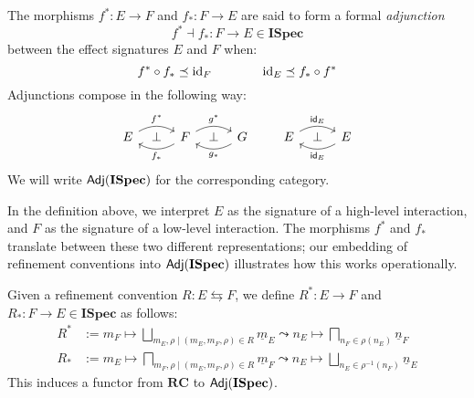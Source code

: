 \documentclass[sigplan,10pt,authordraft]{acmart}
\newcommand{\ISpec}{\mathbf{ISpec}}
\begin{document}
\begin{definition}[Adjunction]
The morphisms
$f^* : E \rightarrow F$ and $f_* : F \rightarrow E$
are said to form a formal \emph{adjunction}
\[ f^* \dashv f_* : F \rightarrow E \in \ISpec \]
between the effect signatures $E$ and $F$
when:
\[
  f^* \circ f_* \preceq \mathrm{id}_F
  \qquad \qquad
  \mathrm{id}_E \preceq f_* \circ f^*
\]
Adjunctions compose in the following way:
\[
  \begin{tikzcd}[sep=tiny]
    E \ar[rr, "f^*", bend left] & \bot &
    F \ar[ll, "f_*", bend left]
      \ar[rr, "g^*", bend left] & \bot &
    G \ar[ll, "g_*", bend left]
  \end{tikzcd}
  \qquad
  \begin{tikzcd}[sep=tiny]
    E \ar[rr, "\kw{id}_E", bend left] & \bot &
    E \ar[ll, "\kw{id}_E", bend left]
  \end{tikzcd}
\]
We will write $\kw{Adj}(\ISpec)$ for the corresponding category.
\end{definition}

In the definition above,
we interpret
$E$ as the signature of a high-level interaction, and
$F$ as the signature of a low-level interaction.
The morphisms $f^*$ and $f_*$ translate between
these two different representations;
our embedding of refinement conventions into $\kw{Adj}(\ISpec)$
illustrates how this works operationally.

\begin{definition}
Given a refinement convention $R : E \leftrightarrows F$,
we define
$R^* : E \rightarrow F$ and
$R_* : F \rightarrow E \in \ISpec$ as follows:
\begin{align*}
  R^* &:= m_F \mapsto
    \bigsqcup_{m_E, \rho \mid (m_E, m_F, \rho) \in R}
    \underline{m}_E \leadsto n_E \mapsto
    \bigsqcap_{n_F \in \rho(n_E)}
    \underline{n}_F
  \\
  R_* &:= m_E \mapsto
    \bigsqcap_{m_F, \rho \mid (m_E, m_F, \rho) \in R}
    \underline{m}_F \leadsto n_E \mapsto
    \bigsqcup_{n_E \in \rho^{-1}(n_F)}
    \underline{n}_E
\end{align*}
This induces a functor from $\mathbf{RC}$ to $\kw{Adj}(\ISpec)$.
\end{definition}
\end{document}
